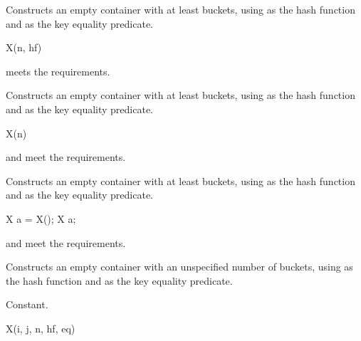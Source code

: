 \begin{itemdescr}
\pnum
\effects
Constructs an empty container with at least  buckets,
using  as the hash function and
 as the key equality predicate.

\pnum
\complexity
{}
\end{itemdescr}

\begin{itemdecl}
X(n, hf)
\end{itemdecl}

\begin{itemdescr}
\pnum
\expects
{} meets the  requirements.

\pnum
\effects
Constructs an empty container with at least  buckets,
using  as the hash function and
 as the key equality predicate.

\pnum
\complexity
{}
\end{itemdescr}

\begin{itemdecl}
X(n)
\end{itemdecl}

\begin{itemdescr}
\pnum
\expects
{} and 
meet the  requirements.

\pnum
\effects
Constructs an empty container with at least  buckets,
using  as the hash function and
 as the key equality predicate.

\pnum
\complexity
{}
\end{itemdescr}

\begin{itemdecl}
X a = X();
X a;
\end{itemdecl}

\begin{itemdescr}
\pnum
\expects
{} and  meet
the  requirements.

\pnum
\effects
Constructs an empty container with an unspecified number of buckets,
using  as the hash function and
 as the key equality predicate.

\pnum
\complexity
Constant.
\end{itemdescr}

\begin{itemdecl}
X(i, j, n, hf, eq)
\end{itemdecl}

